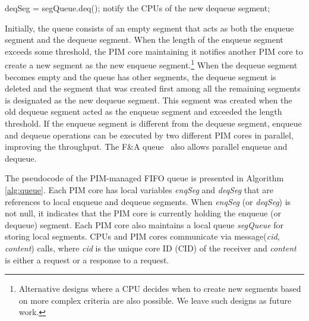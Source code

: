\begin{algorithm*}[ht!]
{\begin{multicols}{2}
\begin{algorithmic}[1]
\algrestore{}
	\State deqSeg = segQueue.deq();
	\State notify the CPUs of the new dequeue segment; 
\EndProcedure
\end{algorithmic}

\end{multicols}
}
\vspace{-2ex}
\end{algorithm*}

Initially, the queue consists of an empty segment that acts as both the enqueue segment and 
the dequeue segment. 
When the length of the enqueue segment exceeds some threshold, the PIM core maintaining it
notifies another PIM core to create a new segment as the new enqueue segment.\footnote{
Alternative designs where a CPU decides when to create new segments based on more complex 
criteria are also possible. 
We leave such designs as future work. }
When the dequeue segment becomes empty and the queue has other segments, 
the dequeue segment is deleted and the segment that was created first 
among all the remaining segments is designated as the new dequeue segment. 
This segment was created when the old dequeue segment 
acted as the enqueue segment and exceeded the length threshold.
If the enqueue segment is different from the dequeue segment, 
enqueue and dequeue operations can be executed by two different PIM cores 
in parallel, improving the throughput. 
The F\&A queue~\cite{Morrison13} also allows parallel enqueue and dequeue. 

The pseudocode of the PIM-managed FIFO queue is presented in Algorithm \ref{alg:queue}. 
Each PIM core has local variables \textit{enqSeg} and \textit{deqSeg} that are references to 
local enqueue and dequeue segments.
When \textit{enqSeg} (or \textit{deqSeg}) is not null, it indicates that the PIM core is currently 
holding the enqueue (or dequeue) segment.
Each PIM core also maintains a local queue \textit{segQueue} for storing local segments.
CPUs and PIM cores communicate via message(\textit{cid}, \textit{content}) calls, 
where \textit{cid} is the unique core ID (CID) 
of the receiver and \textit{content} is either a request or a response to a request.


